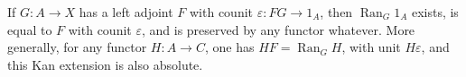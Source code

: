 If $G: A \to X$ has a left adjoint $F$ with counit $\varepsilon: FG \to 1_A$, then $\operatorname{Ran}_G 1_A$ exists, is equal to $F$ with counit $\varepsilon$, and is preserved by any functor whatever. More generally, for any functor $H: A \to C$, one has $HF = \operatorname{Ran}_G H$, with unit $H\varepsilon$, and this Kan extension is also absolute.
